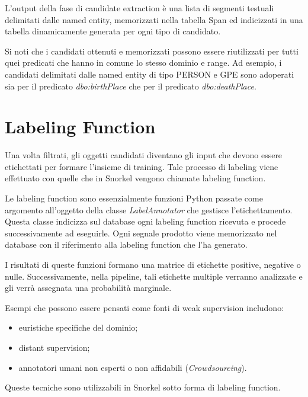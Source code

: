 L'output della fase di candidate extraction è una lista di segmenti testuali delimitati dalle named entity, memorizzati nella tabella Span ed indicizzati in una tabella dinamicamente generata per ogni tipo di candidato.

Si noti che i candidati ottenuti e memorizzati possono essere riutilizzati per tutti quei predicati che hanno in comune lo stesso dominio e range. Ad esempio, i candidati delimitati dalle named entity di tipo PERSON e GPE sono adoperati sia per il predicato \textit{dbo:birthPlace} che per il predicato \textit{dbo:deathPlace}.















\section{Labeling Function}
\label{sec:methods:labelling}

Una volta filtrati, gli oggetti candidati diventano gli input che devono essere etichettati per formare l'insieme di training. Tale processo di labeling viene effettuato con quelle che in Snorkel vengono chiamate labeling function. 

Le labeling function sono essenzialmente funzioni Python passate come argomento all'oggetto della classe \textit{LabelAnnotator} che gestisce l'etichettamento. Questa classe indicizza sul database ogni labeling function ricevuta e procede successivamente ad eseguirle. Ogni segnale prodotto viene memorizzato nel database con il riferimento alla labeling function che l'ha generato.

I risultati di queste funzioni formano una matrice di etichette positive, negative o nulle. Successivamente, nella pipeline, tali etichette multiple verranno analizzate e gli verrà assegnata una probabilità marginale.

Esempi che possono essere pensati come fonti di weak supervision includono:
\begin{itemize}
\item euristiche specifiche del dominio;
\item distant supervision;
\item annotatori umani non esperti o non affidabili (\textit{Crowdsourcing}).
\end{itemize}
Queste tecniche sono utilizzabili in Snorkel sotto forma di labeling function. 

